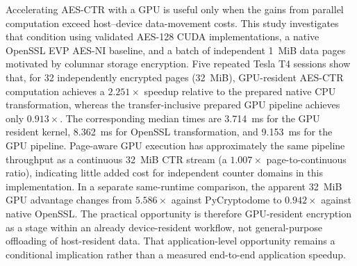 Accelerating AES-CTR with a GPU is useful only when the gains from parallel
computation exceed host--device data-movement costs. This study investigates that
condition using validated AES-128 CUDA implementations, a native OpenSSL EVP
AES-NI baseline, and a batch of independent 1~MiB data pages motivated by
columnar storage encryption. Five repeated Tesla T4 sessions show that, for
32 independently encrypted pages (32~MiB), GPU-resident AES-CTR computation
achieves a $2.251\times$ speedup relative to the prepared native CPU
transformation, whereas the transfer-inclusive prepared GPU pipeline achieves
only $0.913\times$. The corresponding median times are 3.714~ms for the GPU
resident kernel, 8.362~ms for OpenSSL transformation, and 9.153~ms for the
GPU pipeline. Page-aware GPU execution has approximately the same pipeline
throughput as a continuous 32~MiB CTR stream (a $1.007\times$ page-to-continuous
ratio), indicating little added cost for independent counter domains in this
implementation. In a separate same-runtime comparison, the apparent 32~MiB
GPU advantage changes from $5.586\times$ against PyCryptodome to
$0.942\times$ against native OpenSSL. The practical opportunity is therefore
GPU-resident encryption as a stage within an already device-resident workflow,
not general-purpose offloading of host-resident data. That application-level
opportunity remains a conditional implication rather than a measured end-to-end
application speedup.
